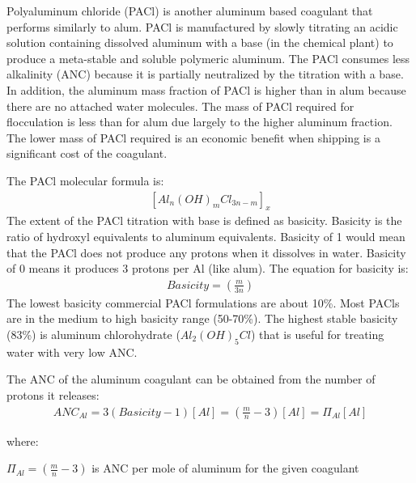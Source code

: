 \documentclass[letterpaper,10pt,english]{sphinxmanual}
\begin{document}
Polyaluminum chloride (PACl) is another aluminum based coagulant that performs similarly to alum. PACl is manufactured by slowly titrating an acidic solution containing dissolved aluminum with a base (in the chemical plant) to produce a meta-stable and soluble polymeric aluminum. The PACl consumes less alkalinity (ANC) because it is partially neutralized by the titration with a base. In addition, the aluminum mass fraction of PACl is higher than in alum because there are no attached water molecules. The mass of PACl required for flocculation is less than for alum due largely to the higher aluminum fraction. The lower mass of PACl required is an economic benefit when shipping is a significant cost of the coagulant.

The PACl molecular formula is:
\begin{equation}\label{equation:Rapid_Mix/RM_Intro:Rapid_Mix/RM_Intro:1}
\begin{split}[Al_n(OH)_mCl_{3n-m}]_x\end{split}
\end{equation}
The extent of the PACl titration with base is defined as basicity. Basicity is the ratio of hydroxyl equivalents to aluminum equivalents. Basicity of 1 would mean that the PACl does not produce any protons when it dissolves in water. Basicity of
0 means it produces 3 protons per Al (like alum). The equation for basicity is:
\begin{equation}\label{equation:Rapid_Mix/RM_Intro:Rapid_Mix/RM_Intro:2}
\begin{split}Basicity = \left( \frac{m}{3n}\right)\end{split}
\end{equation}
The lowest basicity commercial PACl formulations are about 10\%. Most PACls are in the medium to high basicity range (50-70\%). The highest stable basicity (83\%) is aluminum chlorohydrate (\(Al_2(OH)_5Cl\)) that is useful for treating water with very low ANC.

The ANC of the aluminum coagulant can be obtained from the number of protons it releases:
\begin{equation}\label{equation:Rapid_Mix/RM_Intro:Rapid_Mix/RM_Intro:3}
\begin{split}ANC_{Al} = 3(Basicity-1)[Al] = \left(\frac{m}{n} - 3\right)[Al] = \Pi_{Al}[Al]\end{split}
\end{equation}
\begin{DUlineblock}{0em}
\item[] where:
\item[] \(\Pi_{Al}=\left(\frac{m}{n} - 3\right)\) is ANC per mole of aluminum for the given coagulant
\end{DUlineblock}
\end{document}
